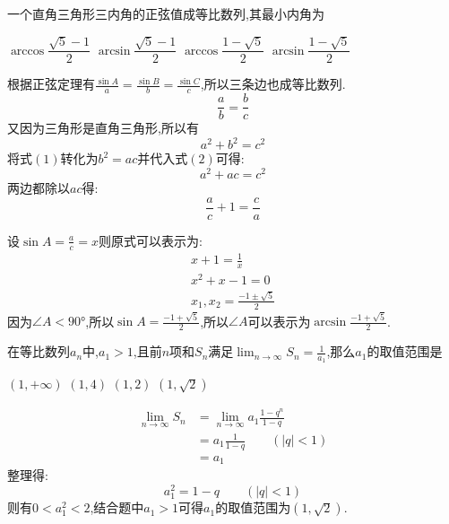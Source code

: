 \begin{questions}
	\question 一个直角三角形三内角的正弦值成等比数列,其最小内角为\hfs

	\begin{oneparchoices}
		\choice $\arccos\dfrac{\sqrt{5}-1}{2}$
		\CorrectChoice $\arcsin\dfrac{\sqrt{5}-1}{2}$
		\choice $\arccos\dfrac{1-\sqrt{5}}{2}$
		\choice $\arcsin\dfrac{1-\sqrt{5}}{2}$
	\end{oneparchoices}

	\begin{solution}
		根据正弦定理有$\frac{\sin A}{a}=\frac{\sin B}{b}=\frac{\sin C}{c}$,所以三条边也成等比数列.
		\begin{equation*}
			\frac{a}{b} = \frac{b}{c} \tag{1}
		\end{equation*}
		又因为三角形是直角三角形,所以有
		\begin{equation*}
			a^2 + b^2 = c^2 \tag{2}
		\end{equation*}
		将式$(1)$转化为$b^2=ac$并代入式$(2)$可得:
		\begin{equation*}
			a^2 + ac = c^2
		\end{equation*}
		两边都除以$ac$得:
		\begin{equation*}
			\frac{a}{c} + 1 = \frac{c}{a}
		\end{equation*}

		设$\sin{A}=\frac{a}{c}=x$则原式可以表示为:
		\begin{align*}
			x + 1 = \frac{1}{x} \\
			x^2 + x - 1 = 0     \\
			x_1,x_2 = \frac{-1\pm\sqrt{5}}{2}
		\end{align*}
		因为$\angle{A}<\ang{90}$,所以$\sin{A}=\frac{-1+\sqrt{5}}{2}$,所以$\angle{A}$可以表示为$\arcsin{\frac{-1+\sqrt{5}}{2}}$.
	\end{solution}

	\question 在等比数列${a_n}$中,$a_1>1$,且前$n$项和$S_n$满足$\displaystyle
		\lim_{n\to\infty}S_n=\frac{1}{a_1}$,那么$a_1$的取值范围是 \hfs

	\begin{oneparchoices}
		\choice $(1,+\infty)$
		\choice $(1,4)$
		\choice $(1,2)$
		\CorrectChoice $(1,\sqrt{2})$
	\end{oneparchoices}

	\begin{solution}
		\begin{align*}
			\lim_{n\to\infty}S_n & = \lim_{n\to\infty}a_1\frac{1-q^n}{1-q} \\
			                     & = a_1\frac{1}{1-q}\qquad (|q|< 1)       \\
			                     & = a_1
		\end{align*}
		整理得:
		\begin{equation*}
			a_1^2 = 1 - q \qquad (|q|<1)
		\end{equation*}
		则有$0<a_1^2<2$,结合题中$a_1>1$可得$a_1$的取值范围为$(1,\sqrt{2})$.
	\end{solution}


\end{questions}
